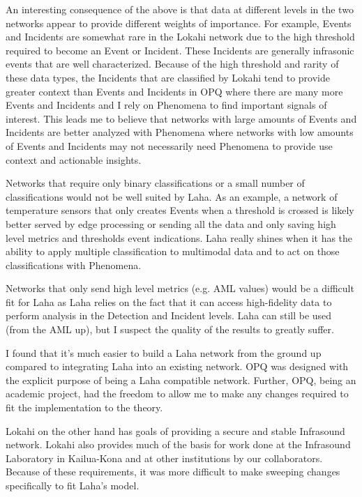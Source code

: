 An interesting consequence of the above is that data at different levels in the two networks appear to provide different weights of importance. For example, Events and Incidents are somewhat rare in the Lokahi network due to the high threshold required to become an Event or Incident. These Incidents are generally infrasonic events that are well characterized. Because of the high threshold and rarity of these data types, the Incidents that are classified by Lokahi tend to provide greater context than Events and Incidents in OPQ where there are many more Events and Incidents and I rely on Phenomena to find important signals of interest. This leads me to believe that networks with large amounts of Events and Incidents are better analyzed with Phenomena where networks with low amounts of Events and Incidents may not necessarily need Phenomena to provide use context and actionable insights.

Networks that require only binary classifications or a small number of classifications would not be well suited by Laha. As an example, a network of temperature sensors that only creates Events when a threshold is crossed is likely better served by edge processing or sending all the data and only saving high level metrics and thresholds event indications. Laha really shines when it has the ability to apply multiple classification to multimodal data and to act on those classifications with Phenomena.

Networks that only send high level metrics (e.g. AML values) would be a difficult fit for Laha as Laha relies on the fact that it can access high-fidelity data to perform analysis in the Detection and Incident levels. Laha can still be used (from the AML up), but I suspect the quality of the results to greatly suffer.

I found that it's much easier to build a Laha network from the ground up compared to integrating Laha into an existing network. OPQ was designed with the explicit purpose of being a Laha compatible network. Further, OPQ, being an academic project, had the freedom to allow me to make any changes required to fit the implementation to the theory.

Lokahi on the other hand has goals of providing a secure and stable Infrasound network. Lokahi also provides much of the basis for work done at the Infrasound Laboratory in Kailua-Kona and at other institutions by our collaborators. Because of these requirements, it was more difficult to make sweeping changes specifically to fit Laha's model.

